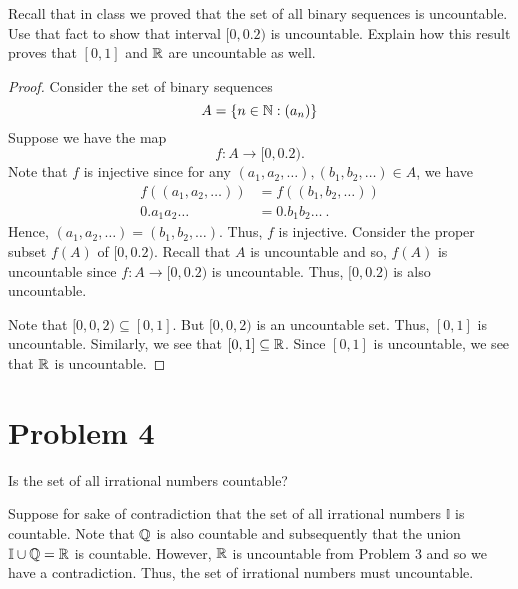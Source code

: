 \documentclass[11pt,a4paper]{article}
\begin{document}
Recall that in class we proved that the set of all binary sequences is uncountable. Use that fact to show that interval \( [0,0.2) \) is uncountable. Explain how this result proves that \( [0,1] \) and \( \mathbb{R}  \) are uncountable as well.

\begin{proof}
Consider the set of binary sequences
\[ A = \{ n \in \mathbb{N} : ({a}_{n})  \} \]
 Suppose we have the map 
\[  f: A   \to [0,0.2). \]
Note that \( f  \) is injective since for any \( ({a}_{1}, {a}_{2}, \dots ), ({b}_{1}, {b}_{2}, \dots) \in A   \), we have   
\begin{align*}
    f(({a}_{1}, {a}_{2}, \dots)) &= f(({b}_{1}, {b}_{2}, \dots )) \\
    0. {a}_{1} {a}_{2} \dots &= 0. {b}_{1} {b}_{2} \dots \ . 
\end{align*}
Hence, \( ({a}_{1}, {a}_{2}, \dots ) = ( {b}_{1}, {b}_{2}, \dots ) \). Thus, \( f  \) is injective.
Consider the proper subset \( f(A)  \) of \( [0,0.2) \). Recall that \( A  \) is uncountable and so, \( f(A)  \) is uncountable since \( f: A \to [0,0.2) \) is uncountable. Thus, \( [0,0.2) \) is also uncountable. 

Note that \( [0,0,2) \subseteq [0,1] \). But \( [0,0,2) \) is an uncountable set. Thus, \( [0,1] \) is uncountable. Similarly, we see that \( [0,1] \subseteq  \mathbb{R}  \). Since \( [0,1] \) is uncountable, we see that \( \mathbb{R}  \) is uncountable.  
\end{proof}

\section*{Problem 4} Is the set of all irrational numbers countable?
\begin{solution}
    Suppose for sake of contradiction that the set of all irrational numbers \( \mathbb{I} \) is countable. Note that \( \mathbb{Q}  \) is also countable and subsequently that the union \( \mathbb{I} \cup \mathbb{Q} = \mathbb{R}   \) is countable. However, \( \mathbb{R}  \) is uncountable from Problem 3 and so we have a contradiction. Thus, the set of irrational numbers must uncountable.  
\end{solution}
\end{document}

